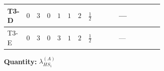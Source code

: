 \documentclass[8pt]{article}
\begin{document}
\begin{landscape}
\begin{longtable}{@{}llcccccc >{\raggedright\arraybackslash}p{0.21\linewidth} >{\raggedright\arraybackslash}p{0.21\linewidth} >{\raggedright\arraybackslash}p{0.21\linewidth}@{}}
\midrule
T3-D & $0$ & $3$ & $0$ & $1$ & $1$ & $2$ & $\frac{1}{2}$ & \scriptsize\adjustbox{max width=\linewidth}{$\begin{gathered} -\frac{3 {g_1}^2 {\lambda_{HS_1}^{(A)}}}{2}\end{gathered}$} & --- & \scriptsize\adjustbox{max width=\linewidth}{$\begin{gathered} +2 {\lambda_1} {\lambda_{HS_1}^{(A)}}\end{gathered}$} \\
\midrule
T3-E & $0$ & $3$ & $0$ & $3$ & $1$ & $2$ & $\frac{1}{2}$ & \scriptsize\adjustbox{max width=\linewidth}{$\begin{gathered} -\frac{3 {g_1}^2 {\lambda_{HS_1}^{(A)}}}{2}\end{gathered}$} & --- & \scriptsize\adjustbox{max width=\linewidth}{$\begin{gathered} +2 {\lambda_1} {\lambda_{HS_1}^{(A)}}\end{gathered}$} \\
\midrule
\bottomrule
\end{longtable}
\clearpage
\noindent\textbf{Quantity: }$\lambda_{HS_1}^{(A)}$\par\smallskip

\end{landscape}
\end{document}
